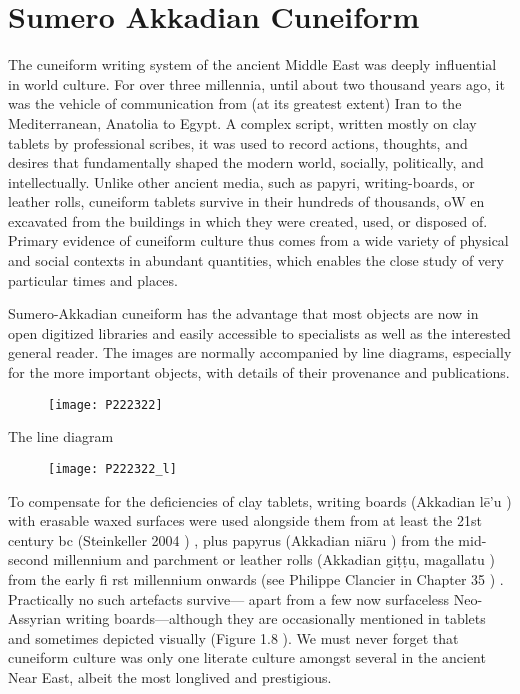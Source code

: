 \chapter{Sumero Akkadian Cuneiform}
\label{s:sumero}
\newfontfamily{}




The cuneiform writing system of the ancient Middle East was deeply influential in
world culture. For over three millennia, until about two thousand years ago, it was the
vehicle of communication from (at its greatest extent) Iran to the Mediterranean,
Anatolia to Egypt. A complex script, written mostly on clay tablets by professional
scribes, it was used to record actions, thoughts, and desires that fundamentally
shaped the modern world, socially, politically, and intellectually. Unlike other ancient
media, such as papyri, writing-boards, or leather rolls, cuneiform tablets survive in their
hundreds of thousands, oW en excavated from the buildings in which they were created,
used, or disposed of. Primary evidence of cuneiform culture thus comes from a wide
variety of physical and social contexts in abundant quantities, which enables the close
study of very particular times and places.


Sumero-Akkadian cuneiform has the advantage that most objects are now in open digitized libraries and easily accessible to specialists as well as the interested general reader. The images are normally accompanied by line diagrams, especially for the more important objects, with details of their provenance and publications. 

\begin{figure}[htbp]
\centering
\texttt{[image: P222322]}
\end{figure}

The line diagram

\begin{figure}[htbp]
\texttt{[image: P222322\_l]}
\end{figure}

To compensate for the deficiencies of clay tablets, writing boards (Akkadian lē’u ) with
erasable waxed surfaces were used alongside them from at least the 21st century bc
(Steinkeller 2004 ) , plus papyrus (Akkadian niāru ) from the mid-second millennium
and parchment or leather rolls (Akkadian giṭṭu, magallatu ) from the early fi rst millennium
onwards (see Philippe Clancier in Chapter 35 ) . Practically no such artefacts survive—
apart from a few now surfaceless Neo-Assyrian writing boards—although they
are occasionally mentioned in tablets and sometimes depicted visually (Figure 1.8 ). We
must never forget that cuneiform culture was only one literate culture amongst several
in the ancient Near East, albeit the most longlived and prestigious.



